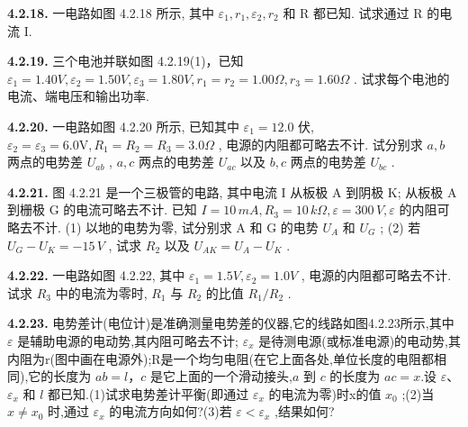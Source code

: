 \vfill
\newpage

\textbf{4.2.18.} 一电路如图 4.2.18 所示, 其中 $\varepsilon_{1}, r_{1}, \varepsilon_{2}, r_{2}$ 和 R 都已知. 试求通过 R 的电流 I.

\vfill
\newpage

\textbf{4.2.19.} 三个电池并联如图 4.2.19(1)，已知 $\varepsilon_{1}=1.40V,\varepsilon_{2}=1.50V,\varepsilon_{3}=1.80V,r_{1}=r_{2}=1.00\Omega,r_{3}=1.60\Omega$ . 试求每个电池的电流、端电压和输出功率.

\begin{center}
\end{center}

\vfill
\newpage

\textbf{4.2.20.} 一电路如图 4.2.20 所示, 已知其中 $\varepsilon_{1} = 12.0$ 伏, $\varepsilon_{2} = \varepsilon_{3} = 6.0\mathrm{V}, R_{1} = R_{2} = R_{3} = 3.0\Omega$ , 电源的内阻都可略去不计. 试分别求 $a, b$ 两点的电势差 $U_{ab}$ , $a, c$ 两点的电势差 $U_{ac}$ 以及 $b, c$ 两点的电势差 $U_{bc}$ .

\vfill
\newpage

\textbf{4.2.21.} 图 4.2.21 是一个三极管的电路, 其中电流 I 从板极 A 到阴极 K; 从板极 A 到栅极 G 的电流可略去不计. 已知 $I = 10 \, mA, R_{3} = 10 \, k\Omega, \varepsilon = 300 \, V, \varepsilon$ 的内阻可略去不计. (1) 以地的电势为零, 试分别求 A 和 G 的电势 $U_{A}$ 和 $U_{G}$ ; (2) 若 $U_{G} - U_{K} = -15 \, V$ , 试求 $R_{2}$ 以及 $U_{AK} = U_{A} - U_{K}$ .

\vfill
\newpage

\textbf{4.2.22.} 一电路如图 4.2.22, 其中 $\varepsilon_{1}=1.5V, \varepsilon_{2}=1.0V$ , 电源的内阻都可略去不计. 试求 $R_{3}$ 中的电流为零时, $R_{1}$ 与 $R_{2}$ 的比值 $R_{1}/R_{2}$ .

\vfill
\newpage

\textbf{4.2.23.} 电势差计(电位计)是准确测量电势差的仪器,它的线路如图4.2.23所示,其中 $\varepsilon$ 是辅助电源的电动势,其内阻可略去不计; $\varepsilon_{x}$ 是待测电源(或标准电源)的电动势,其内阻为r(图中画在电源外);R是一个均匀电阻(在它上面各处,单位长度的电阻都相同),它的长度为 $ab=l$，$c$ 是它上面的一个滑动接头,$a$ 到 $c$ 的长度为 $ac=x$.设 $\varepsilon$、$\varepsilon_x$ 和 $l$ 都已知.(1)试求电势差计平衡(即通过 $\varepsilon_{x}$ 的电流为零)时x的值 $x_{0}$ ;(2)当 $x\neq x_{0}$ 时,通过 $\varepsilon_{x}$ 的电流方向如何?(3)若 $\varepsilon<\varepsilon_{x}$ ,结果如何?

\begin{center}
\end{center}

